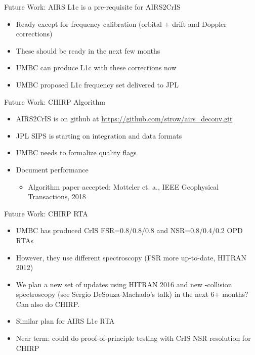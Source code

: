 \documentclass[10pt,t]{beamer}
\begin{document}
\begin{frame}[label={sec:org120f3e8}]{Future Work: AIRS L1c is a pre-requisite for AIRS2CrIS}
\begin{itemize}
\item Ready except for frequency calibration (orbital + drift and Doppler corrections)
\item These should be ready in the next few months
\item UMBC can produce L1c with these corrections now
\item UMBC proposed L1c frequency set delivered to JPL
\end{itemize}
\end{frame}
\begin{frame}[label={sec:org594fbe6}]{Future Work: CHIRP Algorithm}
\begin{itemize}
\item AIRS2CrIS is on github at \url{https://github.com/strow/airs\_deconv.git}
\item JPL SIPS is starting on integration and data formats
\item UMBC needs to formalize quality flags
\item Document performance 
\begin{itemize}
\item Algorithm paper accepted: Motteler et. a., IEEE Geophysical Transactions, 2018
\end{itemize}
\end{itemize}
\end{frame}
\begin{frame}[label={sec:org6821d3f}]{Future Work: CHIRP RTA}
\begin{itemize}
\item UMBC has produced CrIS FSR=0.8/0.8/0.8 and NSR=0.8/0.4/0.2 OPD RTAs
\item However, they use different spectroscopy (FSR more up-to-date, HITRAN 2012)
\item We plan a new set of updates using HITRAN 2016 and new \cd-\water collision spectroscopy (see Sergio DeSouza-Machado's talk) in the next 6+ months?  Can also do CHIRP.
\item Similar plan for AIRS L1c RTA
\item Near term: could do proof-of-principle testing with CrIS NSR resolution for CHIRP
\end{itemize}
\end{frame}
\end{document}
